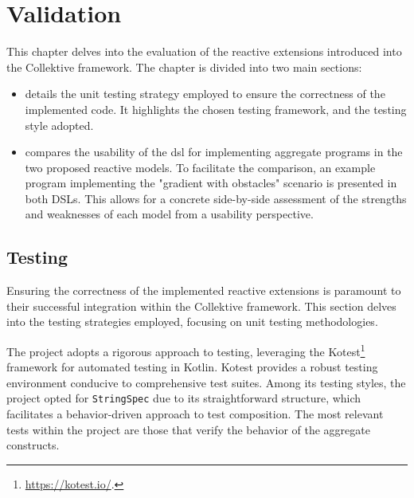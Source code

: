 
\chapter{Validation}
\label{chap:evaluation}

This chapter delves into the evaluation of the reactive extensions introduced into the Collektive framework. The chapter is divided into two main sections:

\begin{itemize}
    \item {} details the unit testing strategy employed to ensure the correctness of the implemented code. It highlights the chosen testing framework, and the testing style adopted.
    \item {} compares the usability of the \ac{dsl} for implementing aggregate programs in the two proposed reactive models. To facilitate the comparison, an example program implementing the "gradient with obstacles" scenario is presented in both DSLs. This allows for a concrete side-by-side assessment of the strengths and weaknesses of each model from a usability perspective.
\end{itemize}

\section{Testing}
\label{section:testing}

Ensuring the correctness of the implemented reactive extensions is paramount to their successful integration within the Collektive framework. This section delves into the testing strategies employed, focusing on unit testing methodologies.

The project adopts a rigorous approach to testing, leveraging the Kotest\footnote{\url{https://kotest.io/}.} framework for automated testing in Kotlin. Kotest provides a robust testing environment conducive to comprehensive test suites. Among its testing styles, the project opted for \texttt{StringSpec} due to its straightforward structure, which facilitates a behavior-driven approach to test composition. The most relevant tests within the project are those that verify the behavior of the aggregate constructs.

